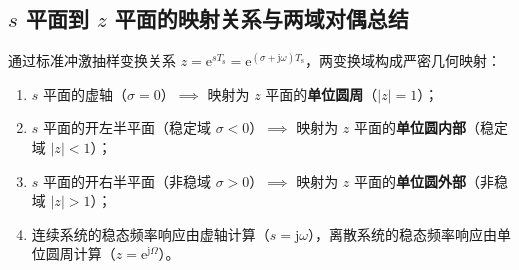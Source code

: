\documentclass[11pt,a4paper,fontset=fandol]{ctexart}
\theoremstyle{remark}
\begin{document}
\subsection{$s$ 平面到 $z$ 平面的映射关系与两域对偶总结}
通过标准冲激抽样变换关系 $z = \mathrm{e}^{s T_{\mathrm{s}}} = \mathrm{e}^{(\sigma + \mathrm{j}\omega) T_{\mathrm{s}}}$，两变换域构成严密几何映射：
\begin{enumerate}
    \item $s$ 平面的虚轴（$\sigma = 0$）$\implies$ 映射为 $z$ 平面的\textbf{单位圆周}（$|z| = 1$）；
    \item $s$ 平面的开左半平面（稳定域 $\sigma < 0$）$\implies$ 映射为 $z$ 平面的\textbf{单位圆内部}（稳定域 $|z| < 1$）；
    \item $s$ 平面的开右半平面（非稳域 $\sigma > 0$）$\implies$ 映射为 $z$ 平面的\textbf{单位圆外部}（非稳域 $|z| > 1$）；
    \item 连续系统的稳态频率响应由虚轴计算（$s = \mathrm{j}\omega$），离散系统的稳态频率响应由单位圆周计算（$z = \mathrm{e}^{\mathrm{j}\Omega}$）。
\end{enumerate}
\end{document}
